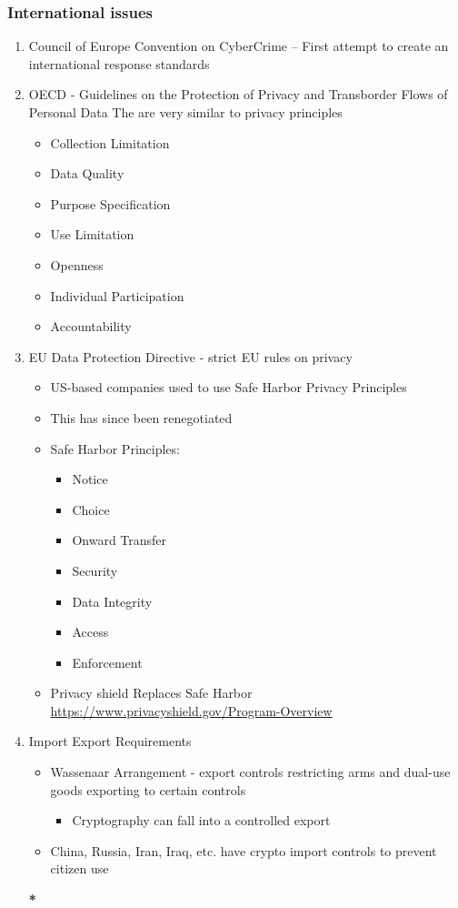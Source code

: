 \documentclass[11pt]{article}
\begin{document}
\subsubsection{International issues}
\label{sec:orgd24ebd7}
\begin{enumerate}
\item Council of Europe Convention on CyberCrime
\label{sec:org7f73d17}
-- First attempt to create an international response standards
\item OECD - Guidelines on the Protection of Privacy and Transborder Flows of Personal Data
\label{sec:orgf78f66e}
The are very similar to privacy principles
\begin{itemize}
\item Collection Limitation
\item Data Quality
\item Purpose Specification
\item Use Limitation
\item Openness
\item Individual Participation
\item Accountability
\end{itemize}
\item EU Data Protection Directive - strict EU rules on privacy
\label{sec:org886e4ac}
\begin{itemize}
\item US-based companies used to use Safe Harbor Privacy Principles
\item This has since been renegotiated
\item Safe Harbor Principles:
\begin{itemize}
\item Notice
\item Choice
\item Onward Transfer
\item Security
\item Data Integrity
\item Access
\item Enforcement
\end{itemize}
\item Privacy shield Replaces Safe Harbor
\url{https://www.privacyshield.gov/Program-Overview}
\end{itemize}
\item Import Export Requirements
\label{sec:org176c3f1}
\begin{itemize}
\item Wassenaar Arrangement - export controls restricting arms and dual-use goods exporting to certain controls
\begin{itemize}
\item Cryptography can fall into a controlled export
\end{itemize}
\item China, Russia, Iran, Iraq, etc. have crypto import controls to prevent citizen use
\end{itemize}
\textbf{\textbf{*}}
\end{enumerate}
\end{document}
